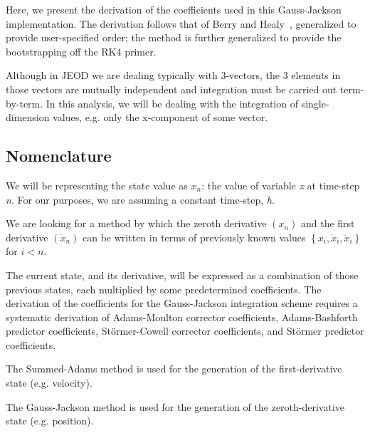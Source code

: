 Here, we present the derivation of the 
coefficients used in this Gauss-Jackson implementation.  The derivation 
follows that of Berry and Healy~\cite{paper:Berry_Healy}, generalized to 
provide user-specified order; the method is further generalized to provide 
the 
bootstrapping off the RK4 primer.

Although in JEOD we are dealing typically with 3-vectors, the 3 elements
in those vectors are mutually independent and integration must be
carried out term-by-term. In this analysis, we will be dealing with
the integration of single-dimension values, e.g. only the x-component
of some vector.

\subsection{Nomenclature}
We will be representing the state value as  $x_{n}$: the value of variable
\textit{x} at time-step \textit{n}. For our purposes, we are assuming
a constant time-step, \textit{h}.

We are looking for a method by which the zeroth derivative
$(x_{n})$ and the first derivative $(\dot{x}_{n})$ can be written in
terms of previously known values 
$\left\{x_{i},\dot{x}_{i},\ddot{x}_{i}\right\}$ for  $i<n$.

The current state, and its derivative, will be expressed as a
combination of those previous states, each multiplied by some
predetermined coefficients. The derivation of the coefficients for
the Gauss-Jackson integration scheme requires a systematic derivation
of Adams-Moulton corrector coefficients, Adams-Bashforth predictor
coefficients, St\"ormer-Cowell corrector coefficients, and St\"ormer
predictor coefficients.

The Summed-Adams method is used for the generation of the first-derivative
state (e.g. velocity).

The Gauss-Jackson method is used for the generation of the zeroth-derivative
state (e.g. position).

